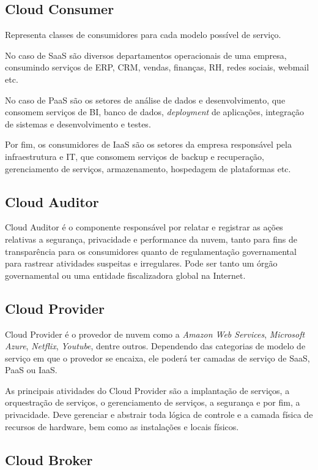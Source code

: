 \subsection{Cloud Consumer}

Representa classes de consumidores para cada modelo possível de serviço. 

No caso de SaaS são diversos departamentos operacionais de uma empresa, consumindo serviços de ERP, CRM, vendas, finanças, RH, redes sociais, webmail etc. 

No caso de PaaS são os setores de análise de dados e desenvolvimento, que consomem serviços de BI, banco de dados, \textit{deployment} de aplicações, integração de sistemas e desenvolvimento e testes.

Por fim, os consumidores de IaaS são os setores da empresa responsável pela infraestrutura e IT, que consomem serviços de backup e recuperação, gerenciamento de serviços, armazenamento, hospedagem de plataformas etc.

\subsection{Cloud Auditor}

Cloud Auditor é o componente responsável por relatar e registrar as ações relativas a segurança, privacidade e performance da nuvem, tanto para fins de transparência para os consumidores quanto de regulamentação governamental para rastrear atividades suspeitas e irregulares. Pode ser tanto um órgão governamental ou uma entidade fiscalizadora global na Internet.

\subsection{Cloud Provider}

Cloud Provider é o provedor de nuvem como a \textit{Amazon Web Services}, \textit{Microsoft Azure}, \textit{Netflix}, \textit{Youtube}, dentre outros. Dependendo das categorias de modelo de serviço em que o provedor se encaixa, ele poderá ter camadas de serviço de SaaS, PaaS ou IaaS. 

As principais atividades do Cloud Provider são a implantação de serviços, a orquestração de serviços, o gerenciamento de serviços, a segurança e por fim, a privacidade. Deve gerenciar e abstrair toda lógica de controle e a camada física de recursos de hardware, bem como as instalações e locais físicos.

\subsection{Cloud Broker}

